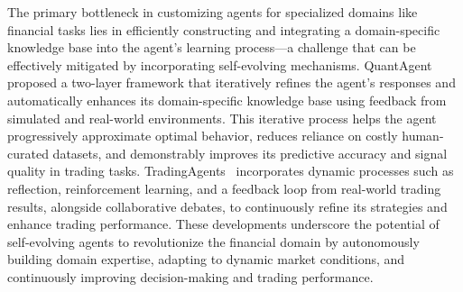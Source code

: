 \documentclass[10pt]{article} %
\begin{document}
The primary bottleneck in customizing agents for specialized domains like financial tasks lies in efficiently constructing and integrating a domain-specific knowledge base into the agent’s learning process—a challenge that can be effectively mitigated by incorporating self-evolving mechanisms. 
QuantAgent~\citep{wang2024quantagent} proposed a two-layer framework that iteratively refines the agent's responses and automatically enhances its domain-specific knowledge base using feedback from simulated and real-world environments. This iterative process helps the agent progressively approximate optimal behavior, reduces reliance on costly human-curated datasets, and demonstrably improves its predictive accuracy and signal quality in trading tasks. 
TradingAgents~\citep{xiao2024tradingagents} incorporates dynamic processes such as reflection, reinforcement learning, and a feedback loop from real-world trading results, alongside collaborative debates, to continuously refine its strategies and enhance trading performance. 
These developments underscore the potential of self-evolving agents to revolutionize the financial domain by autonomously building domain expertise, adapting to dynamic market conditions, and continuously improving decision-making and trading performance.
\end{document}
